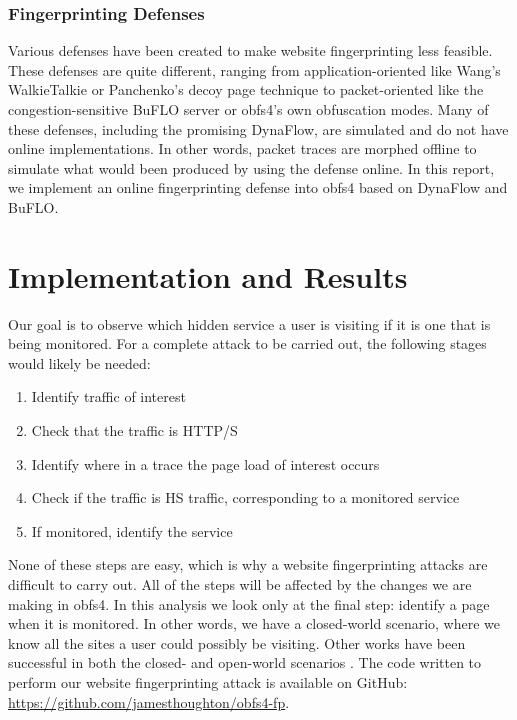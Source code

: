 \documentclass[11pt]{article}
\begin{document}
\subsubsection{Fingerprinting Defenses}
Various defenses have been created to make website fingerprinting less feasible. These defenses are quite different, ranging from application-oriented like Wang's WalkieTalkie\cite{walkietalkie} or Panchenko's decoy page technique\cite{wang} to packet-oriented like the congestion-sensitive BuFLO server\cite{buflo} or obfs4's own obfuscation modes. Many of these defenses, including the promising DynaFlow\cite{dynaflow}, are simulated and do not have online implementations. In other words, packet traces are morphed offline to simulate what would been produced by using the defense online. In this report, we implement an online fingerprinting defense into obfs4 based on DynaFlow and BuFLO.

\section{Implementation and Results}
Our goal is to observe which hidden service a user is visiting if it is one that is being monitored. For a complete attack to be carried out, the following stages would likely be needed:
\begin{enumerate}
    \item Identify traffic of interest
    \item Check that the traffic is HTTP/S
    \item Identify where in a trace the page load of interest occurs
    \item Check if the traffic is HS traffic, corresponding to a monitored service
    \item If monitored, identify the service
\end{enumerate}
None of these steps are easy, which is why a website fingerprinting attacks are difficult to carry out.
All of the steps will be affected by the changes we are making in obfs4.
In this analysis we look only at the final step: identify a page when it is monitored. In other words, we have a closed-world scenario, where we know all the sites a user could possibly be visiting.
Other works have been successful in both the closed- and open-world scenarios \cite{hayes, wang, panchenko}.
The code written to perform our website fingerprinting attack is available on GitHub: \href{https://github.com/jamesthoughton/obfs4-fp}{https://github.com/jamesthoughton/obfs4-fp}.
\end{document}
